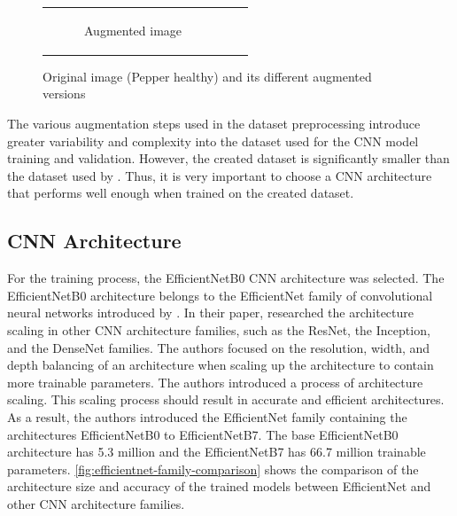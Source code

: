 \documentclass{BachelorBUI}
\begin{document}
\begin{figure}[h]
\begin{tabular}{ccc}
\begin{subfigure}{0.30\textwidth}
                    \caption{\centering Augmented image}
                \end{subfigure} \\
            \end{tabular}
            \caption{\centering Original image (Pepper healthy) and its different augmented versions}
            \label{fig:augmentation-pipeline}
        \end{figure}

        The various augmentation steps used in the dataset preprocessing introduce greater variability and complexity into the dataset used for the CNN model training and validation. However, the created dataset is significantly smaller than the dataset used by \textcite{Mohanty:2016}. Thus, it is very important to choose a CNN architecture that performs well enough when trained on the created dataset.

    \subsection{CNN Architecture}

    For the training process, the EfficientNetB0 CNN architecture was selected. The EfficientNetB0 architecture belongs to the EfficientNet family of convolutional neural networks introduced by \textcite{Tan:2019}. In their paper, \textcite{Tan:2019} researched the architecture scaling in other CNN architecture families, such as the ResNet, the Inception, and the DenseNet families. The authors focused on the resolution, width, and depth balancing of an architecture when scaling up the architecture to contain more trainable parameters. The authors introduced a process of architecture scaling. This scaling process should result in accurate and efficient architectures. As a result, the authors introduced the EfficientNet family containing the architectures EfficientNetB0 to EfficientNetB7. The base EfficientNetB0 architecture has 5.3 million and the EfficientNetB7 has 66.7 million trainable parameters. \autoref{fig:efficientnet-family-comparison} shows the comparison of the architecture size and accuracy of the trained models between EfficientNet and other CNN architecture families.
\end{document}
